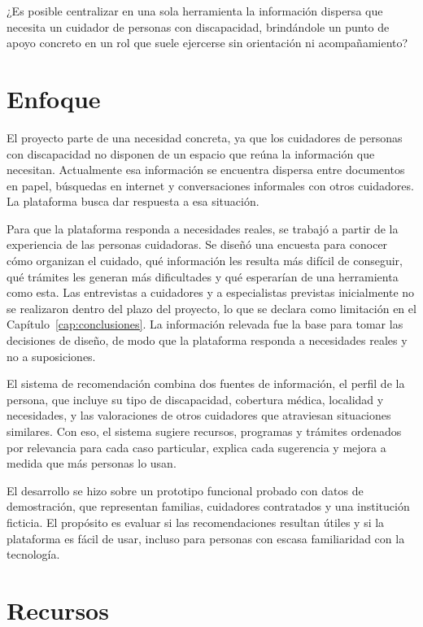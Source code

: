 ¿Es posible centralizar en una sola herramienta la información dispersa que necesita un cuidador de personas con discapacidad, brindándole un punto de apoyo concreto en un rol que suele ejercerse sin orientación ni acompañamiento?

\section{Enfoque}

El proyecto parte de una necesidad concreta, ya que los cuidadores de personas con discapacidad no disponen de un espacio que reúna la información que necesitan. Actualmente esa información se encuentra dispersa entre documentos en papel, búsquedas en internet y conversaciones informales con otros cuidadores. La plataforma busca dar respuesta a esa situación.

Para que la plataforma responda a necesidades reales, se trabajó a partir de la experiencia de las personas cuidadoras. Se diseñó una encuesta para conocer cómo organizan el cuidado, qué información les resulta más difícil de conseguir, qué trámites les generan más dificultades y qué esperarían de una herramienta como esta. Las entrevistas a cuidadores y a especialistas previstas inicialmente no se realizaron dentro del plazo del proyecto, lo que se declara como limitación en el Capítulo~\ref{cap:conclusiones}. La información relevada fue la base para tomar las decisiones de diseño, de modo que la plataforma responda a necesidades reales y no a suposiciones.

El sistema de recomendación combina dos fuentes de información, el perfil de la persona, que incluye su tipo de discapacidad, cobertura médica, localidad y necesidades, y las valoraciones de otros cuidadores que atraviesan situaciones similares. Con eso, el sistema sugiere recursos, programas y trámites ordenados por relevancia para cada caso particular, explica cada sugerencia y mejora a medida que más personas lo usan.

El desarrollo se hizo sobre un prototipo funcional probado con datos de demostración, que representan familias, cuidadores contratados y una institución ficticia. El propósito es evaluar si las recomendaciones resultan útiles y si la plataforma es fácil de usar, incluso para personas con escasa familiaridad con la tecnología.

\section{Recursos}

